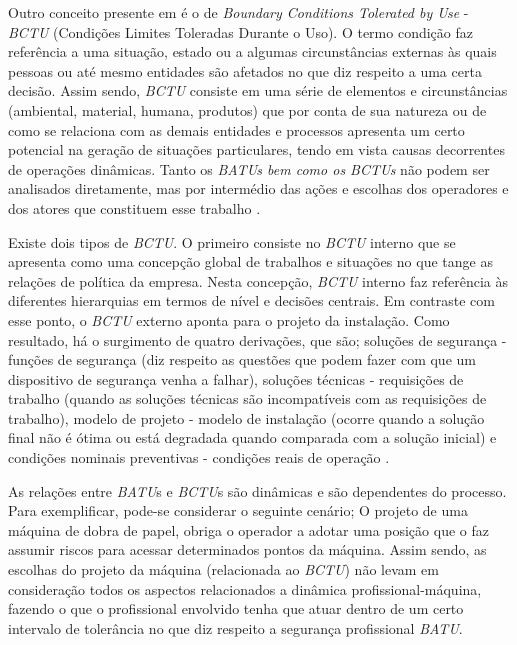 Outro conceito presente em \cite{safety} é o de \textit{Boundary Conditions Tolerated by Use} - \textit{BCTU} (Condições Limites Toleradas Durante o Uso). O termo condição faz referência a uma situação, estado ou a algumas circunstâncias externas às quais pessoas ou até mesmo entidades são afetados no que diz respeito a uma certa decisão. Assim sendo, \textit{BCTU} consiste em uma série de elementos e circunstâncias (ambiental, material, humana, produtos) que por conta de sua natureza ou de como se relaciona com as demais entidades e processos apresenta um certo potencial na geração de situações particulares, tendo em vista causas decorrentes de operações dinâmicas. Tanto os \textit{BATUs bem como os BCTUs} não podem ser analisados diretamente, mas por intermédio das ações e escolhas dos operadores e dos atores que constituem esse trabalho \cite{safety}. 

Existe dois tipos de \textit{BCTU}. O primeiro consiste no \textit{BCTU} interno que se apresenta como uma concepção global de trabalhos e situações no que tange as relações de política da empresa. Nesta concepção, \textit{BCTU} interno faz referência às diferentes hierarquias em termos de nível e decisões centrais. Em contraste com esse ponto, o \textit{BCTU} externo aponta para o projeto da instalação. Como resultado, há o surgimento de quatro derivações, que são; soluções de segurança - funções de segurança (diz respeito as questões que podem fazer com que um dispositivo de segurança venha a falhar), soluções técnicas - requisições de trabalho (quando as soluções técnicas são incompatíveis com as requisições de trabalho), modelo de projeto - modelo de instalação (ocorre quando a solução final não é ótima ou está degradada quando comparada com a solução inicial) e condições nominais preventivas - condições reais de operação
\cite{safety}.

As relações entre \textit{BATU}s e \textit{BCTU}s são dinâmicas e são dependentes do processo. Para exemplificar, pode-se considerar o seguinte cenário; O projeto de uma máquina de dobra de papel, obriga o operador a adotar uma posição que o faz assumir riscos para acessar determinados pontos da máquina.  Assim sendo, as escolhas do projeto da máquina (relacionada ao \textit{BCTU}) não levam em consideração todos os aspectos relacionados a dinâmica profissional-máquina, fazendo o que o profissional envolvido tenha que atuar dentro de um certo intervalo de tolerância no que diz respeito a segurança profissional \textit{BATU}.
